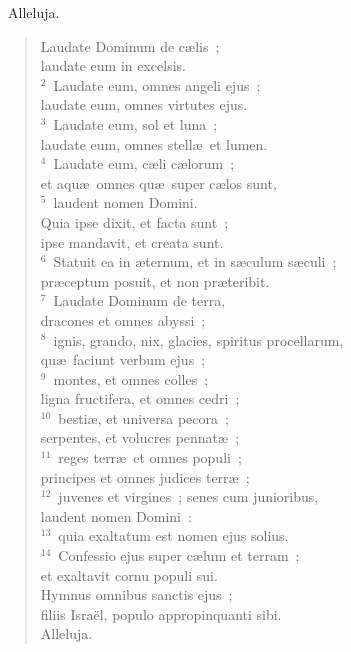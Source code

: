~\lettrine[lines=10,image=true,loversize=0.05,lraise=-0.03]{A}{}lleluja. \begin{flushleft}\begin{verse}\vspace{6pt}Laudate Dominum de c\ae lis~;\\ laudate eum in excelsis.\\
${}^{2}$~Laudate eum, omnes angeli ejus~;\\ laudate eum, omnes virtutes ejus.\\
${}^{3}$~Laudate eum, sol et luna~;\\ laudate eum, omnes stell\ae\ et lumen.\\
${}^{4}$~Laudate eum, c\ae li c\ae lorum~;\\ et aqu\ae\ omnes qu\ae\ super c\ae los sunt,\\
${}^{5}$~laudent nomen Domini.\\ Quia ipse dixit, et facta sunt~;\\ ipse mandavit, et creata sunt.\\
${}^{6}$~Statuit ea in \ae ternum, et in s\ae culum s\ae culi~;\\ pr\ae ceptum posuit, et non pr\ae teribit.\\
${}^{7}$~Laudate Dominum de terra,\\ dracones et omnes abyssi~;\\
${}^{8}$~ignis, grando, nix, glacies, spiritus procellarum,\\ qu\ae\ faciunt verbum ejus~;\\
${}^{9}$~montes, et omnes colles~;\\ ligna fructifera, et omnes cedri~;\\
${}^{10}$~besti\ae , et universa pecora~;\\ serpentes, et volucres pennat\ae~;\\
${}^{11}$~reges terr\ae\ et omnes populi~;\\ principes et omnes judices terr\ae~;\\
${}^{12}$~juvenes et virgines~; senes cum junioribus,\\ laudent nomen Domini~:\\
${}^{13}$~quia exaltatum est nomen ejus solius.\\
${}^{14}$~Confessio ejus super c\ae lum et terram~;\\ et exaltavit cornu populi sui.\\ Hymnus omnibus sanctis ejus~;\\ filiis Isra\"el, populo appropinquanti sibi.\\ Alleluja.\end{verse}\end{flushleft}


